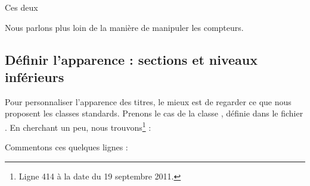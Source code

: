 Ces deux 

\begin{plusloins}
Nous parlons plus loin de la manière de manipuler les compteurs.
\end{plusloins}

\subsection{Définir l'apparence : sections et niveaux inférieurs}\label{apparencetitre}

Pour personnaliser l'apparence des titres, le mieux est de regarder ce que nous proposent les classes standards. Prenons le cas de la classe , définie dans le fichier . En cherchant un peu, nous trouvons\footnote{Ligne 414 à la date du 19 septembre 2011.} :

\begin{latexcode}
\newcommand\section{\@startsection {section}{1}{\z@}%
                             {-3.5ex \@plus -1ex \@minus -.2ex}%
                             {2.3ex \@plus.2ex}%
                             {\normalfont\Large\bfseries}}
\end{latexcode}

Commentons ces quelques lignes :

